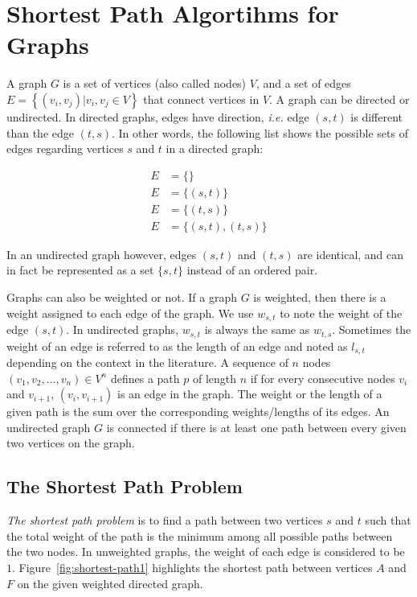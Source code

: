\section{Shortest Path Algortihms for Graphs}
\label{sec:bkg:graph}
A graph $G$ is a set of vertices (also called nodes) $V$, and a set of edges $E=\left\{(v_i, v_j) | v_i, v_j \in V\right\}$ that connect vertices in $V$. A graph can be directed or undirected. In directed graphs, edges have direction, \emph{i.e.} edge $(s, t)$ is different than the edge $(t, s)$. In other words, the following list shows the possible sets of edges regarding vertices $s$ and $t$ in a directed graph:

\begin{align}
  E &= \{\} \nonumber \\
  E &= \{(s, t)\} \nonumber \\
  E &= \{(t, s)\} \nonumber \\
  E &= \{(s, t), (t, s)\}
\end{align}

In an undirected graph however, edges $(s, t)$ and $(t, s)$ are identical, and can in fact be represented as a set $\{s, t\}$ instead of an ordered pair.

Graphs can also be weighted or not. If a graph $G$ is weighted, then there is a weight assigned to each edge of the graph. We use $w_{s,t}$ to note the weight of the edge $(s,t)$. In undirected graphs, $w_{s, t}$ is always the same as $w_{t, s}$. Sometimes the weight of an edge is referred to as the length of an edge and noted as $l_{s,t}$ depending on the context in the literature. A sequence of $n$ nodes $(v_1, v_2,\ldots,v_n) \in V^n$ defines a path $p$ of length $n$ if for every consecutive nodes $v_i$ and $v_{i+1}$, $(v_i, v_{i+1})$ is an edge in the graph. The weight or the length of a given path is the sum over the corresponding weights/lengths of its edges.
An undirected graph $G$ is connected if there is at least one path between every given two vertices on the graph.

\subsection{The Shortest Path Problem}
\emph{The shortest path problem} is to find a path between two vertices $s$ and $t$ such that the total weight of the path is the minimum among all possible paths between the two nodes. In unweighted graphs, the weight of each edge is considered to be $1$. Figure~\ref{fig:shortest-path1} highlights the shortest path between vertices $A$ and $F$ on the given weighted directed graph.

